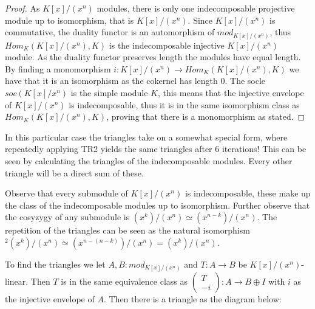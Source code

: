 \documentclass[11pt]{article}
\theoremstyle{definition}
\theoremstyle{remark}
\newcommand{\upside}[1]{\rotatebox[origin=c]{180}{#1}}
\begin{document}
            \begin{proof}
                As $K[x]/(x^n)$ modules, there is only one indecomposable projective module up to isomorphism, that is $K[x]/(x^n)$. Since $K[x]/(x^n)$ is commutative, the duality functor is an automorphism of $mod_{K[x]/(x^n)}$, thus $Hom_K(K[x]/(x^n),K)$ is the indecomposable injective $K[x]/(x^n)$ module. As the duality functor preserves length the modules have equal length. By finding a monomorphism $i:K[x]/(x^n)\rightarrow Hom_K(K[x]/(x^n),K)$ we have that it is an isomorphism as the cokernel has length $0$. The socle $soc(K[x]/x^n)$ is the simple module $K$, this means that the injective envelope of $K[x]/(x^n)$ is indecomposable, thus it is in the same isomorphism class as $Hom_K(K[x]/(x^n),K)$, proving that there is a monomorphism as stated.
            \end{proof}

            In this particular case the triangles take on a somewhat special form, where repeatedly applying TR2 yields the same triangles after 6 iterations! This can be seen by calculating the triangles of the indecomposable modules. Every other triangle will be a direct sum of these.

            Observe that every submodule of $K[x]/(x^n)$ is indecomposable, these make up the class of the indecomposable modules up to isomorphism. Further observe that the cosyzygy of any submodule is \upside{$\Omega$}$(x^k)/(x^n)\simeq (x^{n-k})/(x^n)$. The repetition of the triangles can be seen as the natural isomorphism \upside{$\Omega$}$^2(x^k)/(x^n)\simeq (x^{n-(n-k)})/(x^n) = (x^k)/(x^n)$.

            To find the triangles we let $A,B:mod_{K[x]/(x^n)}$ and $T:A\rightarrow B$ be $K[x]/(x^n)$-linear. Then $T$ is in the same equivalence class as $\begin{pmatrix} T \\ -i \end{pmatrix}:A\rightarrow B\oplus I$ with $i$ as the injective envelope of $A$. Then there is a triangle as the diagram below:

            \begin{center}
            \end{center}
\end{document}
